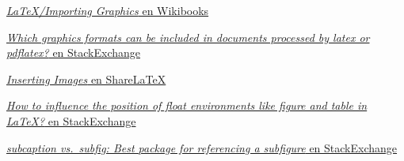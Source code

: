 \href{https://en.wikibooks.org/wiki/LaTeX/Importing_Graphics}{\emph{LaTeX/Importing
Graphics} en Wikibooks}

\href{http://tex.stackexchange.com/questions/1072/which-graphics-formats-can-be-included-in-documents-processed-by-latex-or-pdflat}{\emph{Which
graphics formats can be included in documents processed by latex or
pdflatex?} en StackExchange}

\href{https://www.sharelatex.com/learn/Inserting_Images}{\emph{Inserting
Images} en ShareLaTeX}

\href{http://tex.stackexchange.com/questions/39017/how-to-influence-the-position-of-float-environments-like-figure-and-table-in-lat}{\emph{How
to influence the position of float environments like figure and table in
LaTeX?} en StackExchange}

\href{http://tex.stackexchange.com/questions/13625/subcaption-vs-subfig-best-package-for-referencing-a-subfigure}{\emph{subcaption
vs.~subfig: Best package for referencing a subfigure} en StackExchange}
